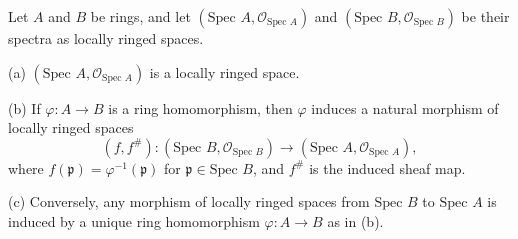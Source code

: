 Let $A$ and $B$ be rings, and let $(\text{Spec } A, \mathcal{O}_{\text{Spec } A})$ and $(\text{Spec } B, \mathcal{O}_{\text{Spec } B})$ be their spectra as locally ringed spaces.

(a) $(\text{Spec } A, \mathcal{O}_{\text{Spec } A})$ is a locally ringed space.

(b) If $\varphi: A \to B$ is a ring homomorphism, then $\varphi$ induces a natural morphism of locally ringed spaces
$$(f, f^\#): (\text{Spec } B, \mathcal{O}_{\text{Spec } B}) \to (\text{Spec } A, \mathcal{O}_{\text{Spec } A}),$$
where $f(\mathfrak{p}) = \varphi^{-1}(\mathfrak{p})$ for $\mathfrak{p} \in \text{Spec } B$, and $f^\#$ is the induced sheaf map.

(c) Conversely, any morphism of locally ringed spaces from $\text{Spec } B$ to $\text{Spec } A$ is induced by a unique ring homomorphism $\varphi: A \to B$ as in (b).
